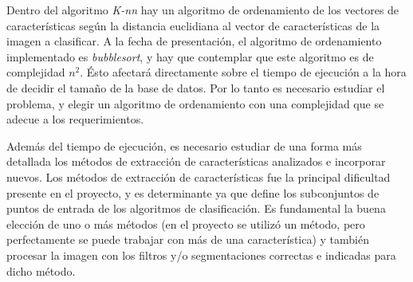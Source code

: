 \documentclass[10pt,a4paper]{article}
\begin{document}
Dentro del algoritmo \textit{K-nn} hay un algoritmo de ordenamiento de los vectores de características según la distancia euclidiana al vector de características de la imagen a clasificar. A la fecha de presentación, el algoritmo de ordenamiento implementado es \textit{bubblesort}, y hay que contemplar que este algoritmo es de complejidad $n^{2}$. Ésto afectará directamente sobre el tiempo de ejecución a la hora de decidir el tamaño de la base de datos. Por lo tanto es necesario estudiar el problema, y elegir un algoritmo de ordenamiento con una complejidad que se adecue a los requerimientos.

Además del tiempo de ejecución, es necesario estudiar de una forma más detallada los métodos de extracción de características analizados e incorporar nuevos. Los métodos de extracción de características fue la principal dificultad presente en el proyecto, y es determinante ya que define los subconjuntos de puntos de entrada de los algoritmos de clasificación. Es fundamental la buena elección de uno o más métodos (en el proyecto se utilizó un método, pero perfectamente se puede trabajar con más de una característica) y también procesar la imagen con los filtros y/o segmentaciones correctas e indicadas para dicho método.

\printbibliography

\newpage
\tableofcontents
\end{document}

